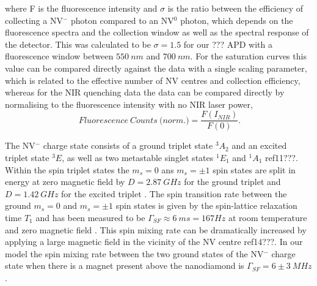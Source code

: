 \documentclass[prl]{revtex4}
\begin{document}
where F is the fluorescence intensity and $\sigma$ is the ratio between the efficiency of collecting a NV$^-$ photon compared to an NV$^0$ photon, which depends on the fluorescence spectra and the collection window as well as the spectral response of the detector. This was calculated to be $\sigma=1.5$ for our ??? APD with a fluorescence window between $\SI{550}{nm}$ and $\SI{700}{nm}$. For the saturation curves this value can be compared directly against the data with a single scaling parameter, which is related to the effective number of NV centres and collection efficiency, whereas for the NIR quenching data the data can be compared directly by normalising to the fluorescence intensity with no NIR laser power,
\begin{equation}
\SI{}{Fluorescence\ Counts\ (norm}.) = \frac{F(I_{NIR})}{F(0)}.
\label{EqnFluoroCounts}
\end{equation}


The NV$^-$ charge state consists of a ground triplet state $^3A_2$ and an excited triplet state $^3E$, as well as two metastable singlet states $^1E_1$ and $^1A_1$ ref11???. Within the spin triplet states the $m_s = 0$ ans $m_s = \pm1$ spin states are split in energy at zero magnetic field by $D=\SI{2.87}{GHz}$ for the ground triplet and $D=\SI{1.42}{GHz}$ for the excited triplet \cite{doherty_nitrogen-vacancy_2013}. The spin transition rate between the ground $m_s = 0$ and $m_s = \pm1$ spin states is given by the spin-lattice relaxation time $T_1$ and has been measured to be $\Gamma_{SF}\approx\SI{6}{ms}=167Hz$ at room temperature and zero magnetic field \cite{jarmola_temperature-_2012}. This spin mixing rate can be dramatically increased by applying a large magnetic field in the vicinity of the NV centre ref14???. In our model the spin mixing rate between the two ground states of the NV$^-$ charge state when there is a magnet present above the nanodiamond is $\Gamma_{SF} = 6\pm \SI{3}{MHz}$.
\end{document}
